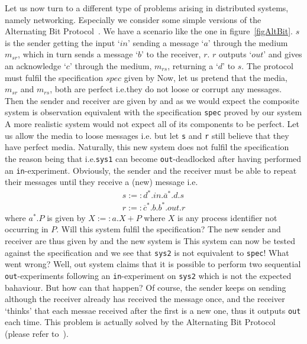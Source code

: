 Let us now turn to a different type of problems arising in distributed systems, namely networking. Especially we consider some simple versions of the Alternating Bit Protocol~\cite{Tanenbaum}. We have a scenario like the one in figure~\ref{figAltBit}. $s$ is the sender getting the input `$in$' sending a message `$a$' through the medium $m_{sr}$, which in turn sends a message `$b$' to the receiver, $r$. $r$ outputs `$out$' and gives an acknowledge `$c$' through the medium, $m_{rs}$, returning a `$d$' to $s$. The protocol must fulfil the specification $spec$ given by
%
Now, let us pretend that the media, $m_{sr}$ and $m_{rs}$, both are perfect i.e.\@ they do not loose or corrupt any messages.
%
Then the sender and receiver are given by
%
and as we would expect the composite system
%
is observation equivalent with the specification \verb!spec! proved by our system
%
A more realistic system would not expect all of its components to be perfect. Let us allow the media to loose messages i.e.\@
{}%
but let \verb!s! and \verb!r! still believe that they have perfect media. Naturally, this new system
%
does not fulfil the specification the reason being that
%
i.e.\@ \verb!sys1! can become \verb!out!-deadlocked after having performed an \verb!in!-experiment. Obviously, the sender and the receiver must be able to repeat their messages until they receive a (new) message i.e.\@
\[\begin{array}{l}
s :=: d^{*}.in.\overline{a}^{*}.d.s\\
r :=: \overline{c}^{*}.b.b^{*}.out.r
\end{array}
\]
where $a^{*}.P$ is given by $X:=: a.X + P$ where $X$ is any process identifier not occurring in $P$. Will this system fulfil the specification? The new sender and receiver are thus given by
%
and the new system is
%
This system can now be tested against the specification
%
and we see that \verb#sys2# is not equivalent to \verb#spec#! What went wrong? Well, out system claims that it is possible to perform two sequential \verb#out#-experiments following an \verb#in#-experiment on \verb#sys2# which is not the expected bahaviour. But how can that happen? Of course, the sender keeps on sending although the receiver already has received the message once, and the receiver `thinks' that each messae received after the first is a new one, thus it outputs \verb#out# each time. This problem is actually solved by the Alternating Bit Protocol (please refer to~\cite{Tanenbaum}).

